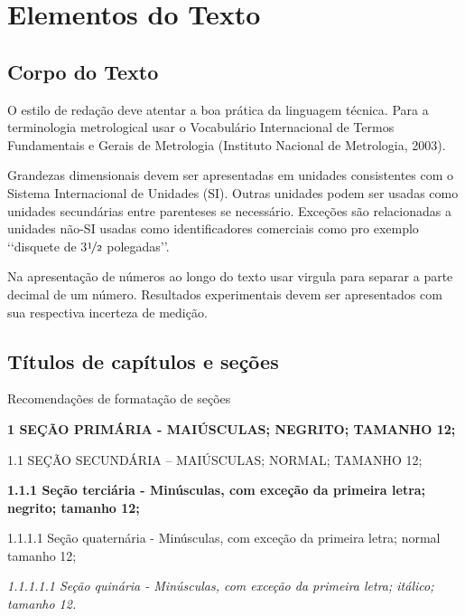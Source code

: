 \chapter[Elementos do Texto]{Elementos do Texto}

\section{Corpo do Texto}

O estilo de redação deve atentar a boa prática da linguagem técnica. Para a
terminologia metrological usar o Vocabulário Internacional de Termos
Fundamentais e Gerais de Metrologia\cite{inmetro2003}  (Instituto Nacional de Metrologia,
2003).

Grandezas dimensionais devem ser apresentadas em unidades consistentes com
o Sistema Internacional de Unidades  (SI). Outras unidades podem ser usadas
como unidades secundárias entre parenteses se necessário. Exceções são
relacionadas a unidades não-SI usadas como identificadores comerciais como
pro exemplo \lq\lq disquete de  3$\nicefrac{1}{2}$ polegadas\rq\rq.

Na apresentação de números ao longo do texto usar virgula para separar a
parte decimal de um número. Resultados experimentais devem ser apresentados
com sua respectiva incerteza de medição.

\section{Títulos de capítulos e seções}

Recomendações de formatação de seções

\begin{description}

	\item \textbf{1 SEÇÃO PRIMÁRIA - MAIÚSCULAS; NEGRITO; TAMANHO 12;}

	\item 1.1 SEÇÃO SECUNDÁRIA – MAIÚSCULAS; NORMAL; TAMANHO 12;

	\item \textbf{1.1.1 Seção terciária - Minúsculas, com exceção da
	primeira letra; negrito; tamanho 12;}

	\item 1.1.1.1 Seção quaternária - Minúsculas, com exceção da primeira
	letra; normal tamanho 12;

 	\item \textit{1.1.1.1.1 Seção quinária - Minúsculas, com exceção da
	primeira letra; itálico; tamanho 12.}

\end{description}

